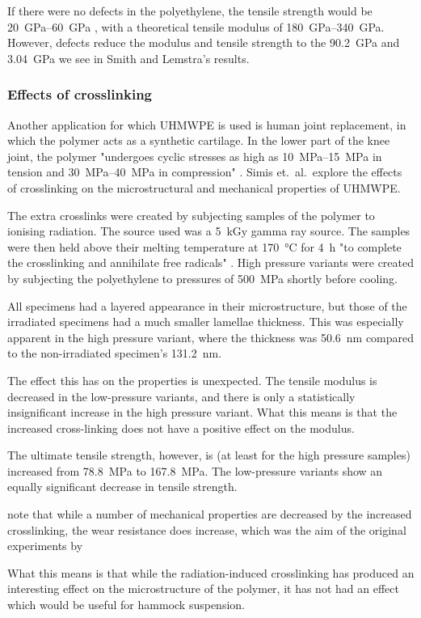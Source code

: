 If there were no defects in the polyethylene, the tensile strength would be \SIrange{20}{60}{\giga\pascal} , with a theoretical tensile modulus of \SIrange{180}{340}{\giga\pascal}. However, defects reduce the modulus and tensile strength to the \SI{90.2}{\giga\pascal} and \SI{3.04}{\giga\pascal} we see in Smith and Lemstra's results. 

\subsubsection{Effects of crosslinking}
Another application for which UHMWPE is used is  human joint replacement, in which the polymer acts as a synthetic cartilage. In the lower part of the knee joint, the polymer "undergoes cyclic stresses as high as \SIrange{10}{15}{\mega\pascal} in tension and \SIrange{30}{40}{\mega\pascal} in compression" . Simis et.\ al.\ explore the effects of crosslinking on the microstructural and mechanical properties of UHMWPE.

The extra crosslinks were created by subjecting samples of the polymer to ionising radiation. The source used was a \SI{5}{\kilo\gray} gamma ray source. The samples were then held above their melting temperature at \SI{170}{\celsius} for \SI{4}{\hour} "to complete the crosslinking and annihilate free radicals" . High pressure variants were created by subjecting the polyethylene to pressures of \SI{500}{\mega\pascal} shortly before cooling.

All specimens had a layered appearance in their microstructure, but those of the irradiated specimens had a much smaller lamellae thickness. This was especially apparent in the high pressure variant, where the thickness was \SI{50.6}{\nano\metre} compared to the non-irradiated specimen's \SI{131.2}{\nano\metre}.

The effect this has on the properties is unexpected. The tensile modulus is decreased in the low-pressure variants, and there is only a statistically insignificant increase in the high pressure variant. What this means is that the increased cross-linking does not have a positive effect on the modulus.

The ultimate tensile strength, however, is (at least for the high pressure samples) increased from \SI{78.8}{\mega\pascal} to \SI{167.8}{\mega\pascal}. The low-pressure variants show an equally significant decrease in tensile strength.

\cite{muratoglu_unified_1999} note that while a number of mechanical properties are decreased by the increased crosslinking, the wear resistance does increase, which was the aim of the original experiments by \cite{simis_combined_2006}

What this means is that while the radiation-induced crosslinking has produced an interesting effect on the microstructure of the polymer, it has not had an effect which would be useful for hammock suspension.
